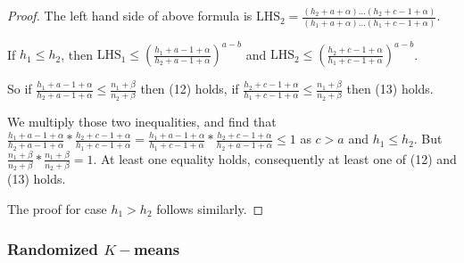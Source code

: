 \documentclass[aoas,preprint]{imsart}
\begin{document}
\begin{proof}
 The left hand side of above formula is $\text{LHS}_2 = \frac{(h_2 + a + \alpha)...(h_2 + c - 1 + \alpha)}{(h_1 + a + \alpha) ... (h_1 + c - 1 + \alpha)}$.

If $h_1 \leq h_2$, then $\text{LHS}_1 \leq (\frac{h_1 + a - 1 + \alpha}{h_2 + a  - 1 + \alpha})^{a - b}$ and $\text{LHS}_2 \leq (\frac{h_2 + c - 1 + \alpha}{h_1 + c  - 1 + \alpha})^{a - b}$.

So if $\frac{h_1 + a - 1 + \alpha}{h_2 + a  - 1 + \alpha} \leq \frac{n_1 + \beta}{n_2 + \beta} $ then (12) holds, if $\frac{h_2 + c - 1 + \alpha}{h_1 + c  - 1 + \alpha} \leq \frac{n_1 + \beta}{n_2 + \beta}$ then (13) holds.

We multiply those two inequalities, and find that $\frac{h_1 + a - 1 + \alpha}{h_2 + a  - 1 + \alpha} * \frac{h_2 + c - 1 + \alpha}{h_1 + c  - 1 + \alpha} = \frac{h_1 + a - 1 + \alpha}{h_1 + c  - 1 + \alpha} * \frac{h_2 + c - 1 + \alpha}{h_2 + a  - 1 + \alpha} \leq 1$ as $c > a$ and $h_1 \leq h_2$. But $\frac{n_1 + \beta}{n_2 + \beta} * \frac{n_1 + \beta}{n_2 + \beta} = 1$. At least one equality holds, consequently at least one of (12) and (13) holds.

The proof for case $h_1 > h_2$ follows similarly.




\end{proof}







\subsubsection{Randomized $K-$means}
\end{document}
